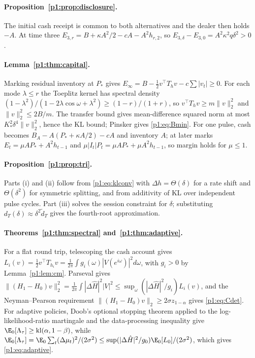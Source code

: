 \paragraph{Proposition~\ref{p1:prop:disclosure}.} The initial cash receipt is common to both alternatives and the dealer then holds $-A$. At time three $E_{3,r}=B+\kappa A^2/2-cA-A^2h_{r,2}$, so $E_{3,\delta}-E_{3,0}=A^2\kappa^2q\delta^2>0$.

\paragraph{Lemma~\ref{p1:thm:capital}.} Marking residual inventory at $P_*$ gives $E_\infty=B-\tfrac12v^\top T_hv-c\sum|v_t|\ge0$. For each mode $\lambda\le r$ the Toeplitz kernel has spectral density $(1-\lambda^2)/(1-2\lambda\cos\omega+\lambda^2)\ge(1-r)/(1+r)$, so $v^\top T_hv\ge m\|v\|_2^2$ and $\|v\|_2^2\le2B/m$. The transfer bound gives mean-difference squared norm at most $K_*^2\delta^4\|v\|_2^2$, hence the KL bound; Pinsker gives \eqref{p1:eq:Bmin}. For one pulse, cash becomes $B_A-A(P_*+\kappa A/2)-cA$ and inventory $A$; at later marks $E_t=\mu AP_*+A^2h_{t-1}$ and $\mu|I_t|P_t=\mu AP_*+\mu A^2h_{t-1}$, so margin holds for $\mu\le1$.

\paragraph{Proposition~\ref{p1:prop:tri}.} Parts (i) and (ii) follow from \eqref{p1:eq:klconv} with $\Delta h=\Theta(\delta)$ for a rate shift and $\Theta(\delta^2)$ for symmetric splitting, and from additivity of KL over independent pulse cycles. Part (iii) solves the session constraint for $\delta$; substituting $d_T(\delta)\approx\delta^2\tilde d_T$ gives the fourth-root approximation.

\paragraph{Theorems~\ref{p1:thm:spectral} and~\ref{p1:thm:adaptive}.} For a flat round trip, telescoping the cash account gives $L_i(v)=\tfrac12v^\top T_{h_i}v=\frac1{2\pi}\int g_i(\omega)|V(e^{i\omega})|^2d\omega$, with $g_i>0$ by Lemma~\ref{p1:lem:cm}. Parseval gives $\|(H_1-H_0)v\|_2^2=\frac1{2\pi}\int|\Delta\hat H|^2|V|^2\le\sup_\omega(|\Delta\hat H|^2/g_i)L_i(v)$, and the Neyman--Pearson requirement $\|(H_1-H_0)v\|_2\ge2\sigma z_{1-\alpha}$ gives \eqref{p1:eq:Cdet}. For adaptive policies, Doob's optional stopping theorem applied to the log-likelihood-ratio martingale and the data-processing inequality give $\E_0[\Lambda_\tau]\ge{\rm kl}(\alpha,1-\beta)$, while $\E_0[\Lambda_\tau]=\E_0\sum_t(\Delta\mu_t)^2/(2\sigma^2)\le\sup(|\Delta\hat H|^2/g_0)\E_0[L_0]/(2\sigma^2)$, which gives \eqref{p1:eq:adaptive}.

